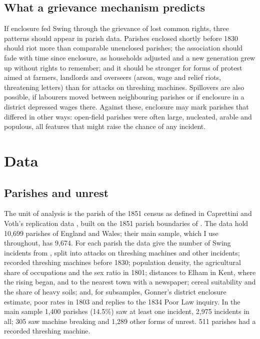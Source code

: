 \documentclass[11pt,a4paper]{article}
\begin{document}
\subsection{What a grievance mechanism predicts}
If enclosure fed Swing through the grievance of lost common rights, three patterns should appear in parish data. Parishes enclosed shortly before 1830 should riot more than comparable unenclosed parishes; the association should fade with time since enclosure, as households adjusted and a new generation grew up without rights to remember; and it should be stronger for forms of protest aimed at farmers, landlords and overseers (arson, wage and relief riots, threatening letters) than for attacks on threshing machines. Spillovers are also possible, if labourers moved between neighbouring parishes or if enclosure in a district depressed wages there. Against these, enclosure may mark parishes that differed in other ways: open-field parishes were often large, nucleated, arable and populous, all features that might raise the chance of any incident.

\section{Data}
\subsection{Parishes and unrest}
The unit of analysis is the parish of the 1851 census as defined in Caprettini and Voth's replication data \citep{caprettinivoth2020data}, built on the 1851 parish boundaries of \citet{satchell2016}. The data hold 10,699 parishes of England and Wales; their main sample, which I use throughout, has 9,674. For each parish the data give the number of Swing incidents from \citet{holland2005}, split into attacks on threshing machines and other incidents; recorded threshing machines before 1830; population density, the agricultural share of occupations and the sex ratio in 1801; distances to Elham in Kent, where the rising began, and to the nearest town with a newspaper; cereal suitability and the share of heavy soils; and, for subsamples, Gonner's district enclosure estimate, poor rates in 1803 and replies to the 1834 Poor Law inquiry. In the main sample 1,400 parishes (14.5\%) saw at least one incident, 2,975 incidents in all; 305 saw machine breaking and 1,289 other forms of unrest. 511 parishes had a recorded threshing machine.
\end{document}
